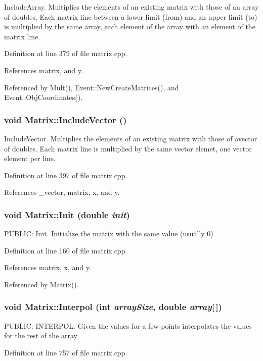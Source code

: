 Include\-Array. Multiplies the elements of an existing matrix with those of an array of doubles. Each matrix line between a lower limit (from) and an upper limit (to) is multiplied by the same array, each element of the array with an element of the matrix line. 

Definition at line 379 of file matrix.cpp.

References matrix, and y.

Referenced by Mult(), Event::New\-Create\-Matrices(), and Event::Obj\-Coordinates().
\subsubsection{\setlength{\rightskip}{0pt plus 5cm}void Matrix::Include\-Vector ()}\label{classMatrix_a8}


Include\-Vector. Multiplies the elements of an existing matrix with those of avector of doubles. Each matrix line is multiplied by the same vector elemet, one vector element per line. 

Definition at line 397 of file matrix.cpp.

References \_\-vector, matrix, x, and y.
\subsubsection{\setlength{\rightskip}{0pt plus 5cm}void Matrix::Init (double {\em init})}\label{classMatrix_a26}


PUBLIC: Init. Initialize the matrix with the same value (usually 0) 

Definition at line 160 of file matrix.cpp.

References matrix, x, and y.

Referenced by Matrix().
\subsubsection{\setlength{\rightskip}{0pt plus 5cm}void Matrix::Interpol (int {\em array\-Size}, double {\em array}[$\,$])}\label{classMatrix_a21}


PUBLIC: INTERPOL. Given the values for a few points interpolates the values for the rest of the array 

Definition at line 757 of file matrix.cpp.

